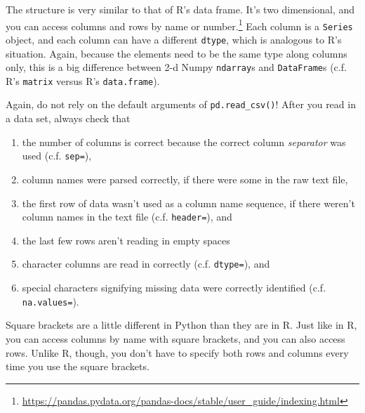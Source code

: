 \documentclass[12pt,krantz2]{krantz}
\providecommand{\tightlist}{%
  \setlength{\itemsep}{0pt}\setlength{\parskip}{0pt}}
\renewcommand{\href}[2]{#2\footnote{\url{#1}}}
\begin{document}
The structure is very similar to that of R's data frame. It's two dimensional, and you can \href{https://pandas.pydata.org/pandas-docs/stable/user_guide/indexing.html}{access columns and rows by name or number.} Each column is a \texttt{Series} object, and each column can have a different \texttt{dtype}, which is analogous to R's situation. Again, because the elements need to be the same type along columns only, this is a big difference between 2-d Numpy \texttt{ndarray}s and \texttt{DataFrame}s (c.f. R's \texttt{matrix} versus R's \texttt{data.frame}).

\begin{rmd-caution}

Again, do not rely on the default arguments of \texttt{pd.read\_csv()}! After you read in a data set, always check that

\begin{enumerate}
\def\labelenumi{\arabic{enumi}.}
\tightlist
\item
  the number of columns is correct because the correct column \emph{separator} was used (c.f. \texttt{sep=}),
\item
  column names were parsed correctly, if there were some in the raw text file,
\item
  the first row of data wasn't used as a column name sequence, if there weren't column names in the text file (c.f. \texttt{header=}), and
\item
  the last few rows aren't reading in empty spaces
\item
  character columns are read in correctly (c.f. \texttt{dtype=}), and
\item
  special characters signifying missing data were correctly identified (c.f. \texttt{na.values=}).
\end{enumerate}


\end{rmd-caution}

Square brackets are a little different in Python than they are in R. Just like in R, you can access columns by name with square brackets, and you can also access rows. Unlike R, though, you don't have to specify both rows and columns every time you use the square brackets.
\end{document}
